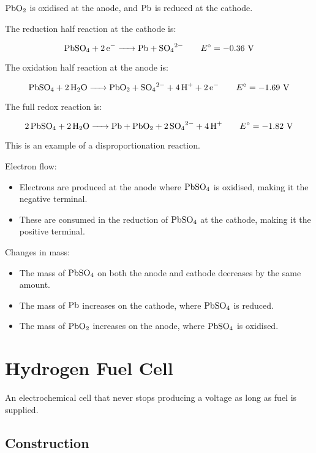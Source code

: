\documentclass[a4paper,11pt]{article}
\begin{document}
$\ce{PbO2}$ is oxidised at the anode, and $\ce{Pb}$ is reduced at the cathode.

The reduction half reaction at the cathode is:

$$
\ce{PbSO4 + 2e- -> Pb + SO4^{2-}} \qquad E^\circ = -0.36\text{ V}
$$

The oxidation half reaction at the anode is:

$$
\ce{PbSO4 + 2H2O -> PbO2 + SO4^{2-} + 4H+ + 2e-} \qquad E^\circ = -1.69\text{ V}
$$

The full redox reaction is:

$$
\ce{2PbSO4 + 2H2O -> Pb + PbO2 + 2SO4^{2-} + 4H+} \qquad E^\circ = -1.82\text{ V}
$$

This is an example of a disproportionation reaction.

Electron flow:

\begin{itemize}
\item Electrons are produced at the anode where $\ce{PbSO4}$ is oxidised, making
	it the negative terminal.
\item These are consumed in the reduction of $\ce{PbSO4}$ at the cathode, making
	it the positive terminal.
\end{itemize}

Changes in mass:

\begin{itemize}
\item The mass of $\ce{PbSO4}$ on both the anode and cathode decreases by the
	same amount.
\item The mass of $\ce{Pb}$ increases on the cathode, where $\ce{PbSO4}$ is
	reduced.
\item The mass of $\ce{PbO2}$ increases on the anode, where $\ce{PbSO4}$ is
	oxidised.
\end{itemize}



\section{Hydrogen Fuel Cell}

An electrochemical cell that never stops producing a voltage as long as fuel is
supplied.

\subsection{Construction}

\end{document}
